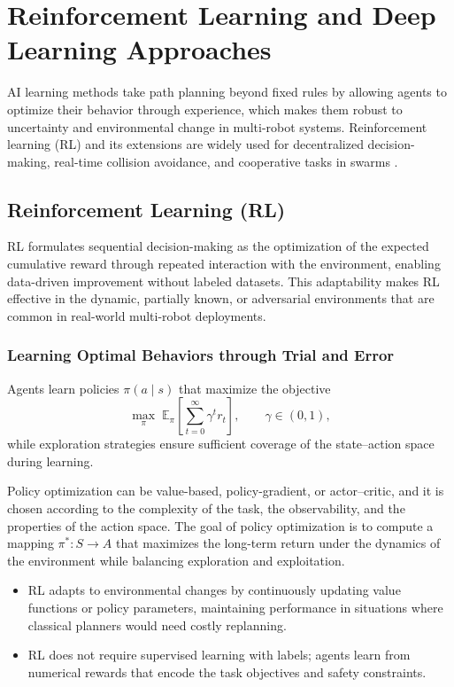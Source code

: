 \section{Reinforcement Learning and Deep Learning Approaches}\label{sec:learning}

AI learning methods take path planning beyond fixed rules by allowing agents to
optimize their behavior through experience, which makes them robust to
uncertainty and environmental change in multi-robot systems. Reinforcement
learning (RL) and its extensions are widely used for decentralized
decision-making, real-time collision avoidance, and cooperative tasks in swarms
\cite{he2021integral}.

\subsection{Reinforcement Learning (RL)}

RL formulates sequential decision-making as the optimization of the expected
cumulative reward through repeated interaction with the environment, enabling
data-driven improvement without labeled datasets. This adaptability makes RL
effective in the dynamic, partially known, or adversarial environments that are
common in real-world multi-robot deployments.

\subsubsection{Learning Optimal Behaviors through Trial and Error}

Agents learn policies $\pi(a \mid s)$ that maximize the objective
\begin{equation}
  \max_{\pi}\; \mathbb{E}_{\pi}\!\left[\sum_{t=0}^{\infty} \gamma^{t} r_t\right],
  \qquad \gamma \in (0,1),
  \label{eq:rl-objective}
\end{equation}
while exploration strategies ensure sufficient coverage of the state--action space
during learning.

Policy optimization can be value-based, policy-gradient, or actor--critic, and it
is chosen according to the complexity of the task, the observability, and the
properties of the action space. The goal of policy optimization is to compute a
mapping $\pi^{*} : S \to A$ that maximizes the long-term return under the dynamics
of the environment while balancing exploration and exploitation.
\begin{itemize}
  \item {} RL adapts to environmental changes by continuously
        updating value functions or policy parameters, maintaining performance in
        situations where classical planners would need costly replanning.
  \item {} RL does not require supervised learning
        with labels; agents learn from numerical rewards that encode the task
        objectives and safety constraints.
\end{itemize}

